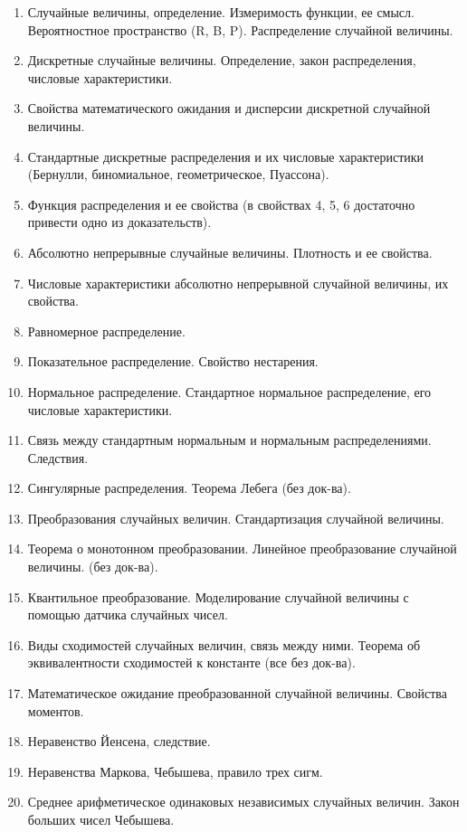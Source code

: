 \begin{enumerate}
    
    \item Случайные величины, определение. Измеримость функции, ее смысл. Вероятностное пространство (R, B, P). Распределение случайной величины.
    \item Дискретные случайные величины. Определение, закон распределения, числовые характеристики.
    \item Свойства математического ожидания и дисперсии дискретной случайной величины.
    \item Стандартные дискретные распределения и их числовые характеристики (Бернулли, биномиальное, геометрическое, Пуассона).
    \item Функция распределения и ее свойства (в свойствах 4, 5, 6 достаточно привести одно из доказательств).
    \item Абсолютно непрерывные случайные величины. Плотность и ее свойства.
    \item Числовые характеристики абсолютно непрерывной случайной величины, их свойства.
    \item Равномерное распределение. 
    \item Показательное распределение. Свойство нестарения.
    \item Нормальное распределение. Стандартное нормальное распределение, его числовые характеристики.
    \item Связь между стандартным нормальным и нормальным распределениями. Следствия.
    \item Сингулярные распределения. Теорема Лебега (без док-ва).
    \item Преобразования случайных величин. Стандартизация случайной величины. 
    \item Теорема о монотонном преобразовании. Линейное преобразование случайной величины. (без док-ва).
    \item Квантильное преобразование. Моделирование случайной величины с помощью датчика случайных чисел.
    \item Виды сходимостей случайных величин, связь между ними. Теорема об эквивалентности сходимостей к константе (все без док-ва).
    \item Математическое ожидание преобразованной случайной величины. Свойства моментов.
    \item Неравенство Йенсена, следствие.
    \item Неравенства Маркова, Чебышева, правило трех сигм.
    \item Среднее арифметическое одинаковых независимых случайных величин. Закон больших чисел Чебышева.

\end{enumerate}
